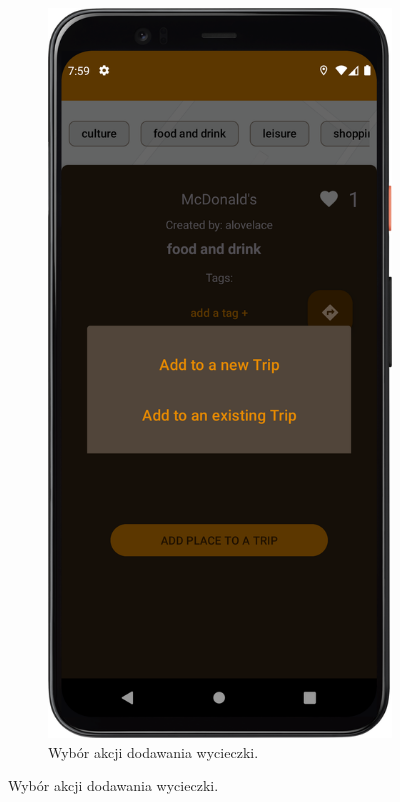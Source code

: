 \begin{figure}[H]
\begin{subfigure}[b]{0.3\textwidth}
                \includegraphics[width=\textwidth]{src/app/trip_dialog.png}
                \caption{Wybór akcji dodawania wycieczki.\label{trip_dialog}}

\end{subfigure}
\end{figure}
